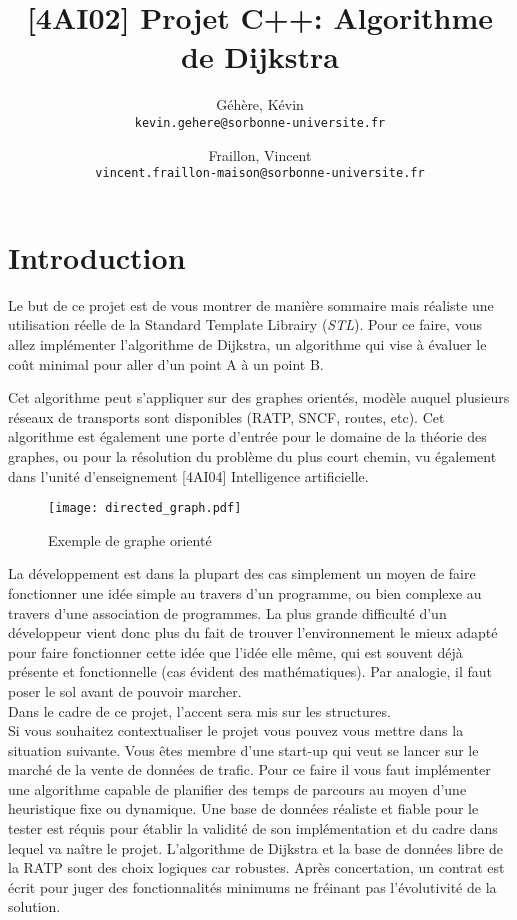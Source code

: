 \documentclass[9pts]{article}
\title{[4AI02] Projet C++: Algorithme de Dijkstra}
\author{
  Géhère, Kévin\\
  \texttt{kevin.gehere@sorbonne-universite.fr}
  \and
  Fraillon, Vincent\\
  \texttt{vincent.fraillon-maison@sorbonne-universite.fr}
}
\begin{document}
\maketitle

\section{Introduction}
Le but de ce projet est de vous montrer de manière sommaire mais réaliste une utilisation réelle de la Standard Template Librairy (\emph{STL}).
Pour ce faire, vous allez implémenter l'algorithme de Dijkstra,
un algorithme qui vise à évaluer le coût minimal pour aller d'un point A à un point B.

Cet algorithme peut s'appliquer sur des graphes orientés, modèle auquel plusieurs réseaux de transports sont disponibles (RATP, SNCF, routes, etc). Cet algorithme est également une porte d'entrée pour le domaine de la théorie des graphes, ou pour la résolution du problème du plus court chemin, vu également dans l'unité d'enseignement [4AI04] Intelligence artificielle.

\begin{figure}[h]
   \centering
   \texttt{[image: directed\_graph.pdf]}
   \caption{\label{directed_graph} Exemple de graphe orienté}
\end{figure}

La développement est dans la plupart des cas simplement un moyen de faire fonctionner une idée simple au travers d'un programme, ou bien complexe au travers d'une association de programmes.
La plus grande difficulté d'un développeur vient donc plus du fait de trouver l'environnement le mieux adapté pour faire fonctionner cette idée que l'idée elle même,
qui est souvent déjà présente et fonctionnelle (cas évident des mathématiques).
Par analogie, il faut poser le sol avant de pouvoir marcher. \\

Dans le cadre de ce projet, l'accent sera mis sur les structures.\\

Si vous souhaitez contextualiser le projet vous pouvez vous mettre dans la situation suivante.
Vous êtes membre d'une start-up qui veut se lancer sur le marché de la vente de données de trafic.
Pour ce faire il vous faut implémenter une algorithme capable de planifier des temps de parcours au moyen d'une heuristique fixe ou dynamique.
Une base de données réaliste et fiable pour le tester est réquis pour établir la validité de son implémentation et du cadre dans lequel va naître le projet.
L'algorithme de Dijkstra et la base de données libre de la RATP sont des choix logiques car robustes.
Après concertation, un contrat est écrit pour juger des fonctionnalités minimums ne fréinant pas l'évolutivité de la solution.
\end{document}
